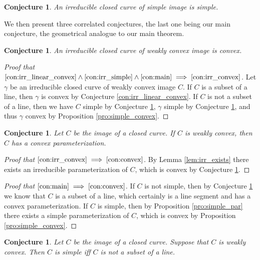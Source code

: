 \documentclass{amsart}
\newtheorem{conjecture}[proposition]{Conjecture}
\theoremstyle{definition}
\theoremstyle{remark}
\begin{document}
\begin{conjecture}
    \label{con:irr_simple}
    An irreducible closed curve of simple image is simple.
\end{conjecture}

We then present three correlated conjectures, the last one
being our main conjecture, the geometrical analogue to
our main theorem.

\begin{conjecture}
    \label{con:irr_convex}
    An irreducible closed curve of weakly convex image is convex.
\end{conjecture}

\begin{proof}[Proof that
        $\ref{con:irr_linear_convex}
            \land\ref{con:irr_simple}
            \land\ref{con:main}
            \implies\ref{con:irr_convex}$]
    Let $\gamma$ be an irreducible closed curve of weakly convex
    image $C$. If $C$ is a subset of a line, then $\gamma$
    is convex by Conjecture \ref{con:irr_linear_convex}.
    If $C$ is not a subset of a line,
    then we have $C$ simple by Conjecture \ref{con:main},
    $\gamma$ simple by Conjecture \ref{con:irr_simple},
    and thus $\gamma$ convex by Proposition \ref{pro:simple_convex}.
\end{proof}

\begin{conjecture}
    \label{con:convex}
    Let $C$ be the image of a closed curve. If $C$ is weakly convex,
    then $C$ has a convex parameterization.
\end{conjecture}

\begin{proof}[Proof that $\ref{con:irr_convex}
            \implies\ref{con:convex}$]
    By Lemma \ref{lem:irr_exists} there exists an irreducible
    parameterization of $C$,
    which is convex by Conjecture \ref{con:irr_convex}.
\end{proof}

\begin{proof}[Proof that $\ref{con:main}\implies\ref{con:convex}$]
    If $C$ is not simple, then by Conjecture
    \ref{con:main} we know that $C$ is a subset of a line,
    which certainly is a line segment and has a convex parameterization.
    If $C$ is simple, then by Proposition \ref{pro:simple_par}
    there exists a simple parameterization of $C$,
    which is convex by Proposition \ref{pro:simple_convex}.
\end{proof}

\begin{conjecture}
    \label{con:main}
    Let $C$ be the image of a closed curve.
    Suppose that $C$ is weakly convex.
    Then $C$ is simple iff $C$ is not a subset of a line.
\end{conjecture}
\end{document}
